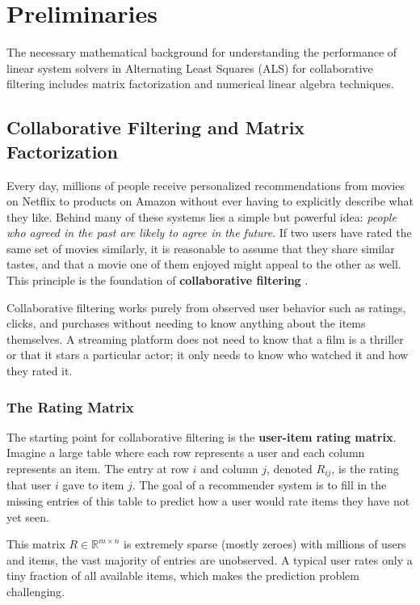 \documentclass[12pt,a4paper]{report}
\begin{document}
\vspace{4em}

\chapter*{Preliminaries}

The necessary mathematical background for understanding the performance of linear system solvers in Alternating Least Squares (ALS) for collaborative filtering includes matrix factorization and numerical linear algebra techniques.

\section{Collaborative Filtering and Matrix Factorization}

Every day, millions of people receive personalized recommendations from movies on Netflix to products on Amazon without ever having to explicitly describe what they like. Behind many of these systems lies a simple but powerful idea: \textit{people who agreed in the past are likely to agree in the future}. If two users have rated the same set of movies similarly, it is reasonable to assume that they share similar tastes, and that a movie one of them enjoyed might appeal to the other as well. This principle is the foundation of \textbf{collaborative filtering} \parencite{ricci2015recommender}.

Collaborative filtering works purely from observed user behavior such as ratings, clicks, and purchases without needing to know anything about the items themselves. A streaming platform does not need to know that a film is a thriller or that it stars a particular actor; it only needs to know who watched it and how they rated it.

\subsection*{The Rating Matrix}

The starting point for collaborative filtering is the \textbf{user-item rating matrix}. Imagine a large table where each row represents a user and each column represents an item. The entry at row \( i \) and column \( j \), denoted \( R_{ij} \), is the rating that user \( i \) gave to item \( j \). The goal of a recommender system is to fill in the missing entries of this table to predict how a user would rate items they have not yet seen.

This matrix \( R \in \mathbb{R}^{m \times n} \) is extremely sparse (mostly zeroes) with millions of users and items, the vast majority of entries are unobserved. A typical user rates only a tiny fraction of all available items, which makes the prediction problem challenging.
\end{document}
